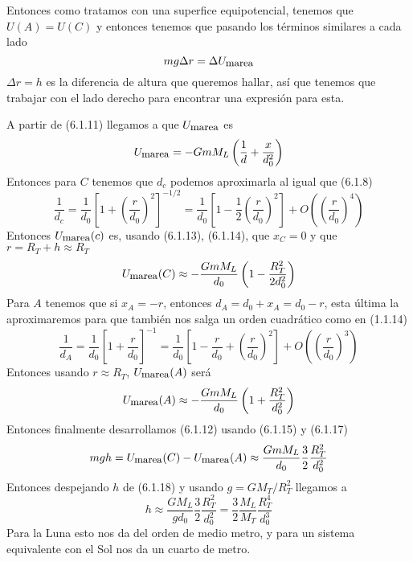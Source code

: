 Entonces como tratamos con una superfice equipotencial, tenemos que $U(A)=U(C)$ y entonces tenemos que pasando los términos similares a cada lado
\begin{equation} \label{6.1.1}
    mg\Delta r = \Delta U_{\mbox{\small marea}}
\end{equation} 
$\Delta r = h$ es la diferencia de altura que queremos hallar, así que tenemos que trabajar con el lado derecho para encontrar una expresión para esta.

A partir de (6.1.11) llegamos a que $U_{\mbox{\small marea}}$ es 
\begin{equation} \label{6.1.1}
    U_{\mbox{\small marea}} = -GmM_L\left(\frac{1}{d}+\frac{x}{d_0^2}\right)
\end{equation} 
Entonces para $C$ tenemos que $d_c$ podemos aproximarla al igual que (6.1.8)
\begin{equation} \label{6.1.1}
    \frac{1}{d_c} = \frac{1}{d_0}\left[1+\left(\frac{r}{d_0}\right)^2\right]^{-1/2} = \frac{1}{d_0}\left[1-\frac{1}{2}\left(\frac{r}{d_0}\right)^2\right] +O\left(\left(\frac{r}{d_0}\right)^4\right)
\end{equation} 
Entonces $U_{\mbox{\small marea}}(c)$ es, usando (6.1.13), (6.1.14), que $x_C=0$ y que $r = R_T+h \approx R_T$
\begin{equation} \label{6.1.1}
    U_{\mbox{\small marea}}(C) \approx -\frac{GmM_L}{d_0}\left(1-\frac{R_T^2}{2d_0^2}\right)
\end{equation} 
Para $A$ tenemos que si $x_A = -r$, entonces $d_A = d_0+x_A =d_0-r$, esta última la aproximaremos para que también nos salga un orden cuadrático como en  (1.1.14)
\begin{equation} \label{6.1.1}
    \frac{1}{d_A} = \frac{1}{d_0}\left[1+\frac{r}{d_0}\right]^{-1} = \frac{1}{d_0}\left[1-\frac{r}{d_0} + \left(\frac{r}{d_0}\right)^2\right] +O\left(\left(\frac{r}{d_0}\right)^3\right)
\end{equation} 
Entonces usando $r \approx R_T$, $U_{\mbox{\small marea}}(A)$ será
\begin{equation} \label{6.1.1}
    U_{\mbox{\small marea}}(A) \approx -\frac{GmM_L}{d_0}\left(1+\frac{R_T^2}{d_0^2}\right)
\end{equation} 
Entonces finalmente desarrollamos (6.1.12) usando (6.1.15) y (6.1.17)
\begin{equation} \label{6.1.1}
mgh = U_{\mbox{\small marea}}(C)-U_{\mbox{\small marea}}(A) \approx \frac{GmM_L}{d_0} \frac{3}{2} \frac{R_T^2}{d_0^2}
\end{equation} 
Entonces despejando $h$ de (6.1.18) y usando $g=GM_T/R_T^2$ llegamos a
\begin{equation} \label{6.1.1}
    h \approx \frac{GM_L}{gd_0} \frac{3}{2} \frac{R_T^2}{d_0^2} = \frac{3}{2} \frac{M_L}{M_T} \frac{R_T^4}{d_0^3} 
    \end{equation} 
Para la Luna esto nos da del orden de medio metro, y para un sistema equivalente con el Sol nos da un cuarto de metro.

